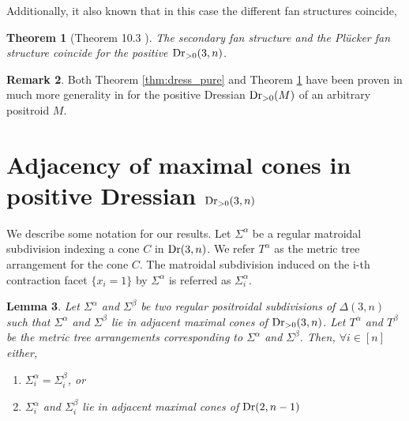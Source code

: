 \documentclass[12pt]{article}
\DeclareMathOperator{\Dr}{\rm Dr}
\theoremstyle{plain}
\newtheorem{theorem}{Theorem}
\newtheorem{lemma}[theorem]{Lemma}
\theoremstyle{definition}
\newtheorem{remark}[theorem]{Remark}
\numberwithin{subcase}{case}
\begin{document}
Additionally, it also known that in this case the different fan structures coincide,

\begin{theorem}[Theorem 10.3 \cite{arkani2021positive}]\label{thm:pos_dress_coincide}
The secondary fan structure and the Plücker fan structure coincide for the positive $\Dr_{> 0}(3,n)$.    
\end{theorem}


\begin{remark}
Both Theorem \ref{thm:dress_pure} and Theorem \ref{thm:pos_dress_coincide} have been proven in much more generality in \cite{arkani2021positive} for the positive Dressian $\Dr_{> 0}(M)$ of an arbitrary positroid $M$.    
\end{remark}

\section{Adjacency of maximal cones in positive Dressian \texorpdfstring{$\Dr_{> 0}(3,n)$}{Dr(3,n)}}\label{sec:Section_3}




We describe some notation for our results. Let $\Sigma^{\alpha}$ be a regular matroidal subdivision indexing a cone $C$ in $\Dr(3,n)$. We refer $T^{\alpha}$ as the metric tree arrangement for the cone $C$. The matroidal subdivision induced on the i-th contraction facet $\{x_{i} = 1\}$ by $\Sigma^{\alpha}$ is referred as $\Sigma^{\alpha}_{i}$.

\begin{lemma}\label{thm:Dr(3,n)_adj}
 Let $\Sigma^{\alpha}$ and $\Sigma^{\beta}$ be two regular positroidal subdivisions of $\Delta(3,n)$ such that $\Sigma^{\alpha}$ and $\Sigma^{\beta}$ lie in adjacent maximal cones of $\Dr_{> 0}(3,n)$. Let $T^{\alpha}$ and $T^{\beta}$ be the metric tree arrangements corresponding to $\Sigma^{\alpha}$ and $\Sigma^{\beta}$. Then, $\forall i \in [n]$ either, 
 \begin{enumerate}
     \item $\Sigma^{\alpha}_{i} = \Sigma^{\beta}_{i}$, or
     \item $\Sigma^{\alpha}_{i}$ and $\Sigma^{\beta}_{i}$ lie in adjacent maximal cones of $\Dr(2,n-1)$
 \end{enumerate}
\end{lemma}
\end{document}
